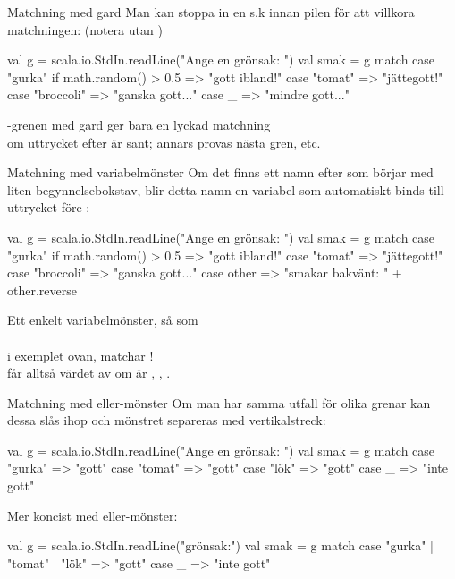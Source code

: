 \begin{Slide}{Matchning med gard}
Man kan stoppa in en s.k   innan pilen \code{=>} för att villkora matchningen: (notera  utan )
\begin{Code}
val g = scala.io.StdIn.readLine("Ange en grönsak: ")
val smak = g match 
  case "gurka" if math.random() > 0.5 => "gott ibland!"
  case "tomat" => "jättegott!"
  case "broccoli" => "ganska gott..."
  case _ => "mindre gott..."
\end{Code}
-grenen med gard ger bara en lyckad matchning \\ om uttrycket efter  är sant; annars provas nästa gren, etc.
\end{Slide}

\begin{Slide}{Matchning med variabelmönster}\SlideFontSmall
Om det finns ett namn efter  som börjar med liten begynnelsebokstav, blir detta namn en variabel som automatiskt binds till uttrycket före :

\begin{Code}
val g = scala.io.StdIn.readLine("Ange en grönsak: ")
val smak = g match 
  case "gurka" if math.random() > 0.5 => "gott ibland!"
  case "tomat" => "jättegott!"
  case "broccoli" => "ganska gott..."
  case other => "smakar bakvänt: " + other.reverse
\end{Code}

Ett enkelt variabelmönster, så som \\  \\ i exemplet ovan, matchar ! \\ får alltså värdet av  om   är , , .

\end{Slide}


\begin{Slide}{Matchning med eller-mönster}\SlideFontSmall
Om man har samma utfall för olika grenar kan dessa slås ihop och mönstret separeras med vertikalstreck: \code{|}
\begin{Code}
val g = scala.io.StdIn.readLine("Ange en grönsak: ")
val smak = g match 
  case "gurka" => "gott"
  case "tomat" => "gott"
  case "lök"   => "gott"
  case _ => "inte gott"
\end{Code}

Mer koncist med eller-mönster:

\begin{Code}
val g = scala.io.StdIn.readLine("grönsak:")
val smak = g match 
  case "gurka" | "tomat" | "lök" => "gott"
  case _ => "inte gott"
\end{Code}



\end{Slide}





